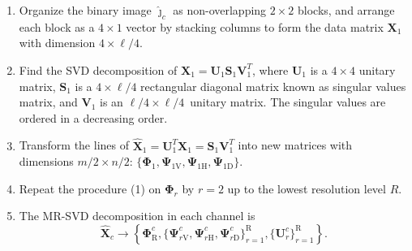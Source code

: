 \documentclass[journal]{IEEEtran}
\begin{document}
\begin{enumerate}
\item Organize the binary image $\bm{\widehat\jmath}_c$ as non-overlapping $2\times 2$ blocks, and arrange each block as a $4\times 1$ vector by stacking columns to form the data matrix $\bm X_1$ with dimension ${4\times{\ell}/{4}}$.
\item Find the SVD decomposition of $\bm X_1=\bm U_1 \bm S_1 \bm V_1^T$, where $\bm U_1$ is a ${4\times 4}$ unitary matrix, $\bm S_1$ is a $4\times{\ell}/{4}$ rectangular diagonal matrix known as singular values matrix, and $\bm V_1$ is an ${\ell}/{4}\times{\ell}/{4}$~unitary matrix. The singular values are ordered in a decreasing order.
\item 
Transform the lines of $\widehat{\bm X}_1=\bm U_1^T\bm X_1=\bm S_1 \bm V_1^T$ into new matrices with dimensions ${m}/{2}\times{n}/{2}$: $\{\bm\Phi_1, \bm\Psi_{1\text{V}}, \bm\Psi_{1\text{H}}, \bm\Psi_{1\text{D}}\}$. 
\item Repeat the procedure (1) on $\bm\Phi_r$ by $r=2$ up to the lowest resolution level $R$. 
\item The MR-SVD decomposition in each channel is
\begin{equation}\nonumber
\widehat{\bm X}_c\rightarrow \left\{\bm \Phi_\text{R}^c,\{\bm\Psi_{r\text{V}}^c,\bm\Psi_{r\text{H}}^c,\bm\Psi_{r\text{D}}^c \}_{r=1}^\text{R},\{\bm U_r^c	\}_{r=1}^\text{R} \right\}.
\end{equation}

\end{enumerate}
\end{document}
